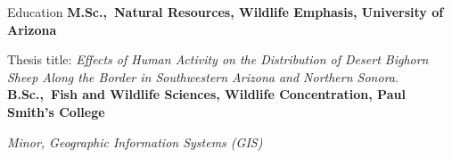 \begin{rubric}{Education}
\entry*[2016 -- 2018]%
	\textbf{M.Sc.,~Natural Resources, Wildlife Emphasis, University of Arizona}\par
	Thesis title: \emph{Effects of Human Activity on the Distribution of Desert Bighorn Sheep Along the Border in Southwestern Arizona and Northern Sonora}.
\entry*[2009 -- 2013]%
	\textbf{B.Sc.,~Fish and Wildlife Sciences, Wildlife Concentration, Paul Smith's College} \par
 \emph{Minor, Geographic Information Systems (GIS)} \par
\end{rubric}